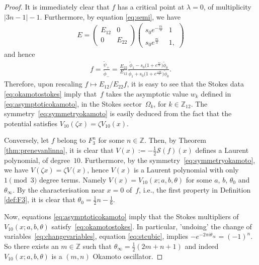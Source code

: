 \documentclass[pdftex]{sigma}
\numberwithin{equation}{section}
\begin{document}
\begin{proof}
	It is immediately clear that $f$ has a critical point at $\lambda=0$, of multiplicity $|3n-1|-1$. Furthermore, by equation \eqref{eq:semi}, we have
	\begin{gather*}
	E=\begin{pmatrix}
	E_{12} & 0\\
	0 & E_{22}
	\end{pmatrix}\begin{pmatrix}
	s_0e^{-\frac{\pi i}{3}} & 1\\
	s_0e^{\frac{\pi i}{3}} & 1,
	\end{pmatrix}
	\end{gather*}
	and hence
	\begin{gather*}
	f=\frac{\widetilde{\psi}_+}{\widetilde{\phi}_-}=\frac{E_{22}}{E_{12}}\frac{\widetilde{\phi}_1-s_0\big(1+e^{\frac{\pi i}{3}}\big)\widetilde{\phi}_0}{\widetilde{\phi}_1+s_0\big(1+e^{\frac{-\pi i}{3}}\big)\widetilde{\phi}_0}.
	\end{gather*}
Therefore, upon rescaling $f\mapsto E_{12}/E_{22}f$, it is easy to see that the Stokes data \eqref{eq:okamotostokes} imply that~$f$ takes the asymptotic value $w_k$ def\/ined in \eqref{eq:asymptoticokamoto}, in the Stokes sector~$\Omega_k$, for $k\in\mathbb{Z}_{12}$. The symmetry~\eqref{eq:symmetryokamoto} is easily deduced from the fact that the potential satisf\/ies $V_{10}(\zeta x)=\zeta V_{10}(x)$.
	
Conversely, let $f$ belong to $F_3^n$ for some $n\in\mathbb{Z}$. Then, by Theorem \ref{thm:prenevanlinna}, it is clear that $V(x):=-\frac12 \mathcal{S}(f)(x)$ def\/ines a Laurent polynomial, of degree~$10$. Furthermore, by the symmetry~\eqref{eq:symmetryokamoto}, we have $V(\zeta x)=\zeta V(x)$, hence $V(x)$ is a Laurent polynomial with only $ 1 \pmod{3}$ degree terms. Namely $ V(x)=V_{10}(x;a,b,\theta)$ for some $a$, $b$, $\theta_0$ and $\theta_\infty$. By the characterisation near $x=0$ of~$f$, i.e., the f\/irst property in Def\/inition \ref{def:F3}, it is clear that $\theta_0=\tfrac{1}{2}n-\tfrac{1}{6}$.
 	
Now, equations \eqref{eq:asymptoticokamoto} imply that the Stokes multipliers of $V_{10}(x;a,b,\theta)$ satisfy~\eqref{eq:okamotostokes}. In particular, 'undoing' the change of variables~\eqref{eq:changevariables}, equation \eqref{eq:stcubic}, implies $-e^{-2\pi i \theta_\infty}=(-1)^n$. So there exists an $m\in\mathbb{Z}$ such that $\theta_\infty=\tfrac{1}{2}(2m+n+1)$ and indeed $V_{10}(x;a,b,\theta)$ is a $(m,n)$ Okamoto oscillator.
\end{proof}
\end{document}
